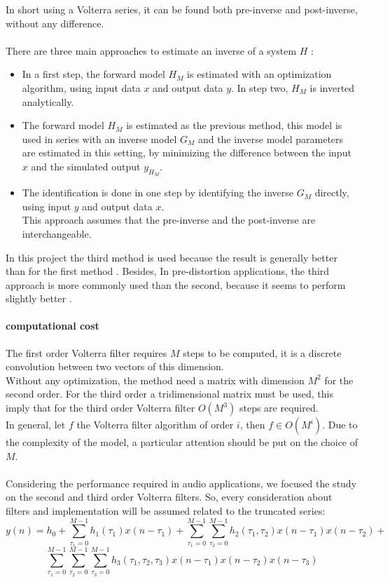 In short using a Volterra series, it can be found both pre-inverse and post-inverse, without any difference.\\\\
There are three main approaches to estimate an inverse of a system $H$ \cite{inverse}:
\begin{itemize}
\item In a first step, the forward model $H_M$ is estimated with an optimization algorithm, using input data $x$ and output data $y$. In step two, $H_M$ is inverted analytically.
\item The forward model $H_M$ is estimated as the previous method, this model is used in series with an inverse model $G_M$ and the inverse model parameters are estimated in this setting, by minimizing the difference between the input $x$ and the simulated output $y_{H_M}$.
\item The identification is done in one step by identifying the inverse $G_M$ directly, using input $y$ and output data $x$.\\ This approach assumes that the pre-inverse and the post-inverse are interchangeable.
\end{itemize}
In this project the third method is used because the result is generally better than for the first method \cite{inverse_estimating}. Besides, In pre-distortion applications, the third approach is more commonly used than the second, because it seems to perform slightly better \cite{comparisonlearning}.
\paragraph{computational cost} The first order Volterra filter requires $M$ steps to be computed, it is a discrete convolution between two vectors of this dimension.\\ Without any optimization, the method need a matrix with dimension $M^2$ for the second order. For the third order a tridimensional matrix must be used, this imply that for the third order Volterra filter $O(M^3)$ steps are required.\\ 
In general, let $f$ the Volterra filter algorithm of order $i$, then $f \in O(M^i)$. Due to the complexity of the model, a particular attention should be put on the choice of $M$.\\\\
Considering the performance required in audio applications, we focused the study on the second and third order Volterra filters. So, every consideration about filters and implementation will be assumed related to the truncated series:
\[
y(n) = h_0 + \sum_{\tau_1=0}^{M-1} h_1(\tau_1)x(n-\tau_1) + \sum_{\tau_1=0}^{M-1}\sum_{\tau_2=0}^{M-1} h_2(\tau_1, \tau_2)x(n-\tau_1)x(n-\tau_2) + \]
\begin{equation}
\sum_{\tau_1=0}^{M-1} \sum_{\tau_2=0}^{M-1} \sum_{\tau_3=0}^{M-1} h_3(\tau_1, \tau_2, \tau_3) x(n-\tau_1)x(n-\tau_2) x(n-\tau_3)
\label{eq:volterra_3_order}
\end{equation}

